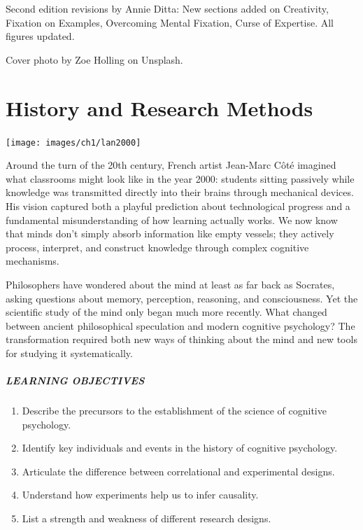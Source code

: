\documentclass[
]{krantz}
\providecommand{\tightlist}{%
  \setlength{\itemsep}{0pt}\setlength{\parskip}{0pt}}
\begin{document}
Second edition revisions by Annie Ditta: New sections added on Creativity, Fixation on Examples, Overcoming Mental Fixation, Curse of Expertise. All figures updated.

Cover photo by Zoe Holling on Unsplash.

\chapter{History and Research Methods}\label{history-and-research-methods}

\begin{center}\texttt{[image: images/ch1/lan2000]} \end{center}

Around the turn of the 20th century, French artist Jean-Marc Côté imagined what classrooms might look like in the year 2000: students sitting passively while knowledge was transmitted directly into their brains through mechanical devices. His vision captured both a playful prediction about technological progress and a fundamental misunderstanding of how learning actually works. We now know that minds don't simply absorb information like empty vessels; they actively process, interpret, and construct knowledge through complex cognitive mechanisms.

Philosophers have wondered about the mind at least as far back as Socrates, asking questions about memory, perception, reasoning, and consciousness. Yet the scientific study of the mind only began much more recently. What changed between ancient philosophical speculation and modern cognitive psychology? The transformation required both new ways of thinking about the mind and new tools for studying it systematically.

\paragraph*{LEARNING OBJECTIVES}\label{learning-objectives}

\begin{enumerate}
\def\labelenumi{\arabic{enumi}.}
\tightlist
\item
  Describe the precursors to the establishment of the science of cognitive psychology.
\item
  Identify key individuals and events in the history of cognitive psychology.
\item
  Articulate the difference between correlational and experimental designs.
\item
  Understand how experiments help us to infer causality.
\item
  List a strength and weakness of different research designs.
\end{enumerate}
\end{document}
